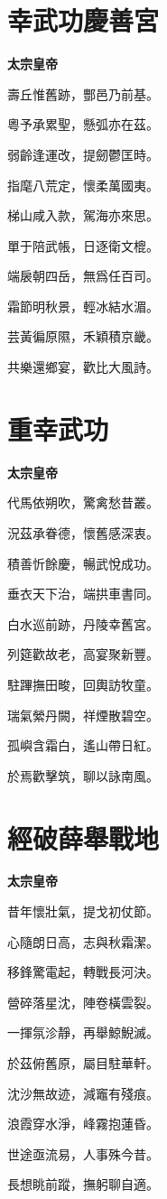 \documentclass[12pt,a4paper]{ctexbook}
\begin{document}
\section{幸武功慶善宮}
\textbf{太宗皇帝}\par\vspace{0.5em}
壽丘惟舊跡，酆邑乃前基。\par
粵予承累聖，懸弧亦在茲。\par
弱齡逢運改，提劒鬱匡時。\par
指麾八荒定，懷柔萬國夷。\par
梯山咸入款，駕海亦來思。\par
單于陪武帳，日逐衛文㮰。\par
端扆朝四岳，無爲任百司。\par
霜節明秋景，輕冰結水湄。\par
芸黃徧原隰，禾穎積京畿。\par
共樂還鄉宴，歡比大風詩。\par

\section{重幸武功}
\textbf{太宗皇帝}\par\vspace{0.5em}
代馬依朔吹，驚禽愁昔叢。\par
況茲承眷德，懷舊感深衷。\par
積善忻餘慶，暢武悅成功。\par
垂衣天下治，端拱車書同。\par
白水巡前跡，丹陵幸舊宮。\par
列筵歡故老，高宴聚新豐。\par
駐蹕撫田畯，回輿訪牧童。\par
瑞氣縈丹闕，祥煙散碧空。\par
孤嶼含霜白，遙山帶日紅。\par
於焉歡擊筑，聊以詠南風。\par

\section{經破薛舉戰地}
\textbf{太宗皇帝}\par\vspace{0.5em}
昔年懷壯氣，提戈初仗節。\par
心隨朗日高，志與秋霜潔。\par
移鋒驚電起，轉戰長河決。\par
營碎落星沈，陣卷橫雲裂。\par
一揮氛沴靜，再舉鯨鯢滅。\par
於茲俯舊原，屬目駐華軒。\par
沈沙無故迹，減竈有殘痕。\par
浪霞穿水淨，峰霧抱蓮昏。\par
世途亟流易，人事殊今昔。\par
長想眺前蹤，撫躬聊自適。\par
\end{document}
